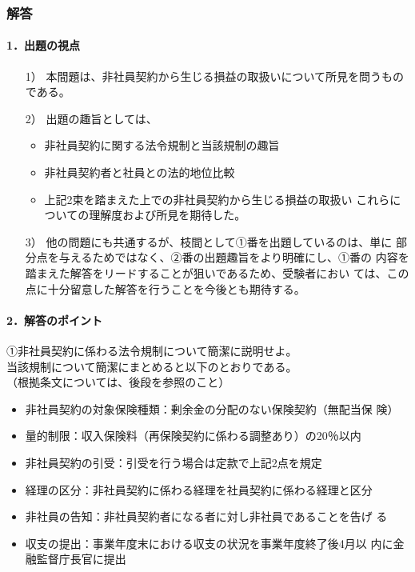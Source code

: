 \documentclass[report,gutter=10mm,fore-edge=10mm,uplatex,dvipdfmx]{jlreq}
\begin{document}
\subsubsection{解答}
\paragraph{1．出題の視点}
\begin{enumerate}
 \item [1）]本間題は、非社員契約から生じる損益の取扱いについて所見を問うもの
 である。
 \item [2）]出題の趣旨としては、
\begin{itemize}
 \item  非社員契約に関する法令規制と当該規制の趣旨
 \item 非社員契約者と社員との法的地位比較
 \item 上記2束を踏まえた上での非社員契約から生じる損益の取扱い
 これらについての理解度および所見を期待した。
\end{itemize} 
 \item [3）]他の問題にも共通するが、枝間として①番を出題しているのは、単に
 部分点を与えるためではなく、②番の出題趣旨をより明確にし、①番の
 内容を踏まえた解答をリードすることが狙いであるため、受験者におい
 ては、この点に十分留意した解答を行うことを今後とも期待する。
\end{enumerate}
\paragraph{2．解答のポイント}
①非社員契約に係わる法令規制について簡潔に説明せよ。\\
当該規制について簡潔にまとめると以下のとおりである。\\
（根拠条文については、後段を参照のこと）
\begin{itemize}
 \item 非社員契約の対象保険種類：剰余金の分配のない保険契約（無配当保
 険）
 \item 量的制限：収入保険料（再保険契約に係わる調整あり）の20％以内
 \item 非社員契約の引受：引受を行う場合は定款で上記2点を規定
 \item 経理の区分：非社員契約に係わる経理を社員契約に係わる経理と区分
 \item 非社員の告知：非社員契約者になる者に対し非社員であることを告げ
 る
 \item 収支の提出：事業年度末における収支の状況を事業年度終了後4月以
 内に金融監督庁長官に提出
\end{itemize}
\end{document}
